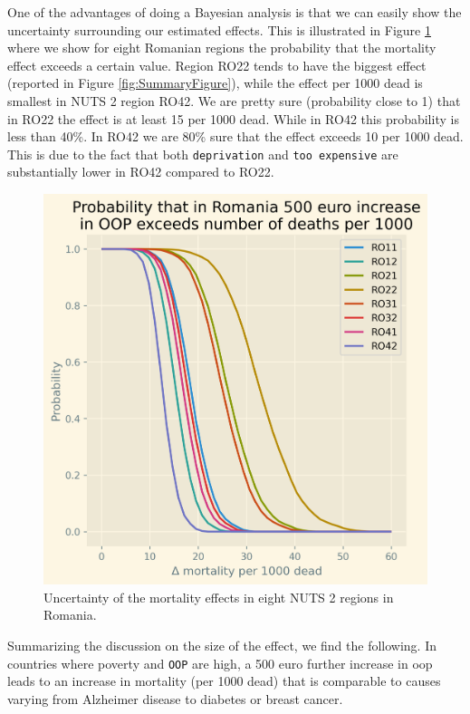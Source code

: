 \documentclass[a4paper,12pt]{article}
\begin{document}
One of the advantages of doing a Bayesian analysis is that we can easily show the uncertainty surrounding our estimated effects. This is illustrated in Figure \ref{fig:EffectRO} where we show for eight Romanian regions the probability that the mortality effect exceeds a certain value. Region RO22 tends to have the biggest effect (reported in Figure \ref{fig:SummaryFigure}), while the effect per 1000 dead is smallest in NUTS 2 region RO42. We are pretty sure (probability close to 1) that in RO22 the effect is at least 15 per 1000 dead. While in RO42 this probability is less than 40\%. In RO42 we are 80\% sure that the effect exceeds 10 per 1000 dead. This is due to the fact that both \texttt{deprivation} and \texttt{too expensive} are substantially lower in RO42 compared to RO22.

\begin{figure}[htbp]
\centering
\includegraphics[width=.9\linewidth]{./figures/Effect_RO.png}
\caption{\label{fig:EffectRO}Uncertainty of the mortality effects in eight NUTS 2 regions in Romania.}
\end{figure}

Summarizing the discussion on the size of the effect, we find the following. In countries where poverty and \texttt{OOP} are high, a 500 euro further increase in oop leads to an increase in mortality (per 1000 dead) that is comparable to causes varying from Alzheimer disease to diabetes or breast cancer.
\end{document}
